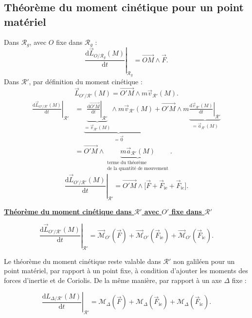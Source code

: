 \documentclass[11pt,a4paper]{article}
\newcommand{\dd}{\mathrm d}
\newcommand{\titr}[1]{\par\textbf{\underline{#1}}\par\nopagebreak[3]}
\newcommand{\etoiles}[1]{\foreach \i in {1,...,#1}{\mathord{\star}\,}}
\newcommand{\R}{\mathcal R}\newcommand{\Rg}{\R_g}
\newcommand{\Fie}{\vec F_{\mathrm{ie}}}\newcommand{\Fic}{\vec F_{\mathrm{ic}}}
\newcommand{\vp}{\vec v_{\R'}}\newcommand{\ap}{\vec a_{\R'}}
\newcommand{\D}[2]{\left.\frac{\dd #1}{\dd t}\right|_{#2}}
\newcommand{\mom}[1]{\vec{\mathcal M}_{#1}}
\begin{document}
\subsection{Théorème du moment cinétique pour un point matériel}
Dans $\Rg$, avec $O$ fixe dans $\Rg$ :
\[\D{\vec L_{O/\Rg}(M)}{\Rg}=\overrightarrow{OM}\wedge\vec F.\]
Dans $\R'$, par définition du moment cinétique :
\[\vec L_{O'/\R'}(M)=\overrightarrow{O'M}\wedge m\vp(M).\]
\begin{align*}
\D{\vec L_{O'/\R'}(M)}{\R'}
&=\underbrace{\underbrace{\D{\overrightarrow{O'M}}{\R'}}_{=\vp(M)}\wedge m\vp(M)}_{=\vec0}
+\overrightarrow{O'M}\wedge m\underbrace{\D{\vp(M)}{\R'}}_{=\ap(M)}\\
&=\overrightarrow{O'M}\wedge\underbrace{m\ap(M)}_{\substack{\text{terme du théorème}\\\text{de la quantité de mouvement}}}.
\end{align*}
\[\D{\vec L_{O'/\R'}(M)}{\R'}=\overrightarrow{O'M}\wedge\bigl[\vec F+\Fie+\Fic\bigr].\]
\titr{Théorème du moment cinétique dans $\R'$ avec $O'$ fixe dans $\R'$}
\begin{cadre}[etoiles={\etoiles{5}}]
\[\D{\vec L_{O'/\R'}(M)}{\R'}=\mom{O'}(\vec F)+\mom{O'}(\Fie)+\mom{O'}(\Fic).\]
\end{cadre}
Le théorème du moment cinétique reste valable dans $\R'$ non galiléen pour un point matériel, par rapport à un point fixe, à condition d'ajouter les moments des forces d'inertie et de Coriolis.
De la même manière, par rapport à un axe $\Delta$ fixe :
\begin{cadre}[etoiles={\etoiles{5}}]
\[\D{L_{\Delta/\R'}(M)}{\R'}=\mathcal M_\Delta(\vec F)+\mathcal M_\Delta(\Fie)+\mathcal M_\Delta(\Fic).\]
\end{cadre}
\end{document}
